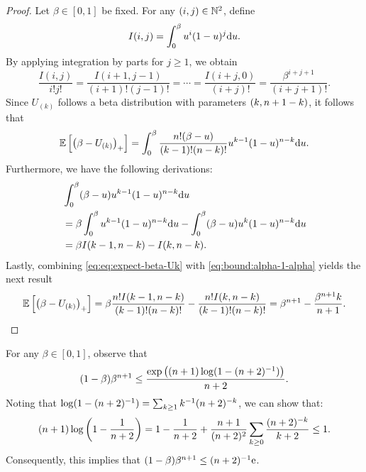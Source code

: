 \begin{proof}
  Let $\beta\in[0,1]$ be fixed.
  For any $(i,j)\in\mathbb{N}^2$, define 
  \[
    I(i,j)
    = \int_0^{\beta} u^i (1-u)^j \mathrm{d} u.
  \]
  By applying integration by parts for $j\ge 1$, we obtain
  \begin{equation*}
    \frac{I(i,j)}{i! j!}
    = \frac{I(i+1,j-1)}{(i+1)! (j-1)!}
    = \cdots
    = \frac{I(i+j,0)}{(i+j)!}
    = \frac{\beta^{i+j+1}}{(i+j+1)!}.
  \end{equation*}
  Since $U_{(k)}$ follows a beta distribution with parameters $(k, n+1-k)$, it follows that
  \begin{equation}\label{eq:eq:expect-beta-Uk}
    \mathbb{E}\left[{\left({\beta - U_{(k)}}\right)_{+}}\right]
    = \int_{0}^{\beta} \frac{n! (\beta - u)}{(k-1)! (n-k)!} u^{k-1} (1-u)^{n-k} \mathrm{d} u.
  \end{equation}
  Furthermore, we have the following derivations:
  \begin{align}
    \nonumber
    &\int_0^{\beta} (\beta-u) u^{k-1} (1-u)^{n-k} \mathrm{d} u
    \\
    \nonumber
    &= \beta \int_0^{\beta} u^{k-1} (1-u)^{n-k} \mathrm{d} u
    - \int_0^{\beta} (\beta-u) u^{k} (1-u)^{n-k} \mathrm{d} u
    \\
    \label{eq:bound:alpha-1-alpha}
    &= \beta I(k-1,n-k) - I(k,n-k).
  \end{align}
  Lastly, combining \eqref{eq:eq:expect-beta-Uk} with \eqref{eq:bound:alpha-1-alpha} yields the next result
  \begin{equation*}
    \mathbb{E}\left[{\left({\beta - U_{(k)}}\right)_{+}}\right]
    = \beta \frac{n! I(k-1,n-k)}{(k-1)! (n-k)!} - \frac{n! I(k,n-k)}{(k-1)! (n-k)!}
    = \beta^{n+1} - \frac{\beta^{n+1} k}{n+1}.
  \end{equation*}
\end{proof}

For any $\beta\in[0,1]$, observe that
\begin{equation*}
  (1-\beta) \beta^{n+1}
  \le \frac{\exp\left({(n+1) \log(1-(n+2)^{-1})}\right)}{n+2}.
\end{equation*}
%
Noting that $\log(1-(n+2)^{-1}) = \sum_{k\ge 1} k^{-1} (n+2)^{-k}$, we can show that:
\begin{equation*}
  (n+1) \log\left({1-\frac{1}{n+2}}\right)
  = 1 - \frac{1}{n+2} + \frac{n+1}{(n+2)^2} \sum_{k\ge 0} \frac{(n+2)^{-k}}{k+2}
  \le 1.
\end{equation*}
%
Consequently, this implies that $(1-\beta) \beta^{n+1}\le (n+2)^{-1} \mathrm{e}$.

